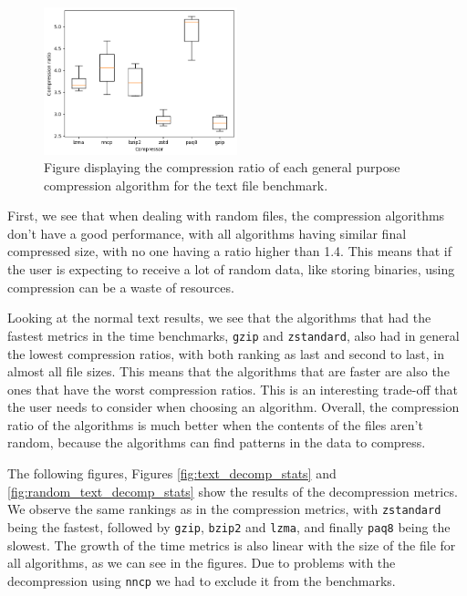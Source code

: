         \begin{figure}[h]
            \centering
            \includegraphics[width=0.5\textwidth]{figs/text_comp_ratio.png}
            \caption[Figure displaying the compression ratio of each general purpose compression algorithm for the text file benchmark.] {Figure displaying the compression ratio of each general purpose compression algorithm for the text file benchmark.}
            \label{fig:text_comp_ratio}
        \end{figure}
        
        First, we see that when dealing with random files, the compression algorithms don't have a good performance, with all algorithms having similar final compressed size, with no one having a ratio higher than 1.4. This means that if the user is expecting to receive a lot of random data, like storing binaries, using compression can be a waste of resources.
        
        Looking at the normal text results, we see that the algorithms that had the fastest metrics in the time benchmarks, \texttt{gzip} and \texttt{zstandard}, also had in general the lowest compression ratios, with both ranking as last and second to last, in almost all file sizes. This means that the algorithms that are faster are also the ones that have the worst compression ratios. This is an interesting trade-off that the user needs to consider when choosing an algorithm.
        Overall, the compression ratio of the algorithms is much better when the contents of the files aren't random, because the algorithms can find patterns in the data to compress.

        The following figures, Figures \ref{fig:text_decomp_stats} and \ref{fig:random_text_decomp_stats} show the results of the decompression metrics. We observe the same rankings as in the compression metrics, with \texttt{zstandard} being the fastest, followed by \texttt{gzip}, \texttt{bzip2} and \texttt{lzma}, and finally \texttt{paq8} being the slowest.
        The growth of the time metrics is also linear with the size of the file for all algorithms, as we can see in the figures. Due to problems with the decompression using \texttt{nncp} we had to exclude it from the benchmarks.


